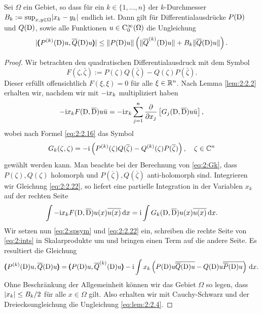 \begin{lem}
Sei $\Omega$ ein Gebiet, so dass für ein $k\in\{1,\ldots,n\}$ der $k$-Durchmesser $B_k:=\sup_{x,y\in\Omega}\lvert x_k-y_k\rvert$ endlich ist. Dann gilt
für Differentialausdrücke $P(\mathrm D)$ und $Q(\mathrm D)$, sowie alle Funktionen $u\in\mathrm C_0^\infty(\Omega)$ die Ungleichung
\begin{equation}\label{eq:lem:2:2.4}
\lvert\pmb(P^{(k)}(\mathrm D)u,\overline{Q}(\mathrm D)u\pmb)\rvert\leq\lVert P(\mathrm D)u\rVert\left(\lVert\overline{Q}^{(k)}(\mathrm D)u\rVert+B_k\lVert\overline{Q}(\mathrm D)u\rVert\right).
\end{equation}
\end{lem}

\begin{proof}
Wir betrachten den quadratischen Differentialausdruck mit dem Symbol
\begin{equation}\label{eq:2:spsym}
F(\zeta,\bar{\zeta}):=P(\zeta)Q(\bar{\zeta})-Q(\zeta)P(\bar{\zeta}).
\end{equation}
Dieser erfüllt offensichtlich $F(\xi,\xi)=0$ für alle $\xi\in\mathbb R^n$.
Nach Lemma \ref{lem:2:2.2} erhalten wir,
nachdem wir mit $-\mathrm i x_k$ multipliziert haben
\begin{equation}\label{eq:2:2.22}
-\mathrm i x_kF(\mathrm D,\overline{\mathrm D})u\bar{u}=-\mathrm i x_k\sum_{j=1}^n\frac{\partial}{\partial x_j}\left[G_j(\mathrm D,\overline{\mathrm D})u\bar{u}\right],
\end{equation}
wobei nach Formel \eqref{eq:2:2.16} das Symbol
\begin{equation}
G_k(\zeta,\zeta)=-\mathrm i\left(P^{(k)}(\zeta)Q(\overline{\zeta})-Q^{(k)}(\zeta)P(\overline{\zeta})\right)\label{eq:2:Gk},
\quad\zeta\in\mathbb C^n
\end{equation}
gewählt werden kann.
Man beachte bei der Berechnung von \eqref{eq:2:Gk},
dass $P(\zeta),Q(\zeta)$ holomorph
und $P(\overline{\zeta}),Q(\overline{\zeta})$ anti-holomorph sind.
Integrieren wir Gleichung \eqref{eq:2:2.22},
so liefert eine partielle Integration
in der Variablen $x_k$ auf der rechten Seite
\begin{equation}\label{eq:2:ints}
\int-\mathrm i x_kF(\mathrm D,\overline{\mathrm D})u(x)\overline{u(x)}\,\mathrm d x=\mathrm i\int G_k(\mathrm D,\overline{\mathrm D})u(x)\overline{u(x)}\,\mathrm d x.
\end{equation}
Wir setzen nun \eqref{eq:2:spsym} und \eqref{eq:2:2.22} ein,
schreiben die rechte Seite von \eqref{eq:2:ints}
in Skalarprodukte um und bringen einen Term auf die andere Seite.
Es resultiert die Gleichung
\begin{equation}
\pmb(P^{(k)}(\mathrm D)u,\overline{Q}(\mathrm D)u\pmb)
=\pmb(P(\mathrm D)u,\overline{Q}^{(k)}(\mathrm D)u\pmb)-\mathrm i\int x_k\left(P(\mathrm D)u\overline{\overline{Q}(\mathrm D)u}-Q(\mathrm D)u\overline{\overline{P}(\mathrm D)u}\right)\,\mathrm d x.
\end{equation}
Ohne Beschränkung der Allgemeinheit können wir das Gebiet $\Omega$ so legen,
dass $\lvert x_k\rvert\leq B_k/2$ für alle $x\in\Omega$ gilt.
Also erhalten wir mit Cauchy-Schwarz
und der Dreiecksungleichung die Ungleichung \eqref{eq:lem:2:2.4}.
\end{proof}

